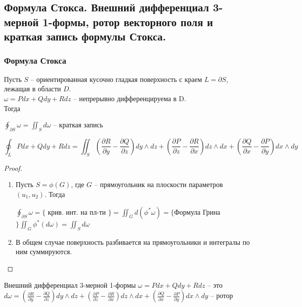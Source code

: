 \subsection{Формула Стокса. Внешний дифференциал 3-мерной 1-формы, ротор векторного поля и краткая запись формулы Стокса.}

\subsubsection{Формула Стокса}
\begin{theorem*}
     Пусть $S$ -- ориентированная кусочно гладкая поверхность с краем $L = \partial S$, лежащая в области $D$.\\
     $\omega = Pdx + Qdy + Rdz$ -- непрерывно дифференцируема в D.\\ 
    Тогда\\
        \begin{center}
            $\oint_{\partial S} \omega = \iint_S d\omega$ -- краткая запись\\
        \end{center}
        $$\oint_L Pdx + Qdy + Rdz = 
        \iint_S (\frac{\partial R}{\partial y} - \frac{\partial Q}{\partial z})dy \wedge dz + (\frac{\partial P}{\partial z} - \frac{\partial R}{\partial x})dz \wedge dx + (\frac{\partial Q}{\partial x} - \frac{\partial P}{\partial y})dx \wedge dy$$
\end{theorem*}
\begin{proof}
    \begin{enumerate}
        \item{Пусть $S = \phi(G)$, где $G$ -- прямоугольник на плоскости параметров $(u_1, u_2)$.
            Тогда\\
                \begin{center}
                    $\oint_{\partial S}\omega = \{$ крив. инт. на пл-ти $\} = \iint_G d(\phi^{*}
                        \omega) = \{$Формула Грина$\} \iint_G \phi^{*}(d\omega) = \iint_S d\omega$
                \end{center}
            }
        \item{В общем случае поверхность разбивается на прямоугольники и интегралы по ним суммируются.}
    \end{enumerate}
\end{proof}

\begin{definition*}
    Внешний дифференциал 3-мерной 1-формы $\omega = Pdx + Qdy + Rdz $ -- это 
    $d\omega = (\frac{\partial R}{\partial y} - \frac{\partial Q}{\partial z})dy \wedge dz 
    + (\frac{\partial P}{\partial z} - \frac{\partial R}{\partial x})dz \wedge dx
    + (\frac{\partial Q}{\partial x} - \frac{\partial P}{\partial y})dx \wedge dy$ -- ротор
\end{definition*}

